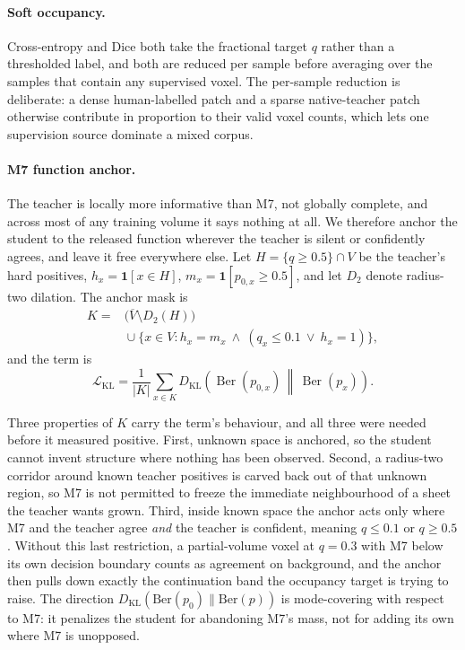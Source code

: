\paragraph{Soft occupancy.}
Cross-entropy and Dice both take the fractional target $q$ rather than a
thresholded label, and both are reduced per sample before averaging over the
samples that contain any supervised voxel.
The per-sample reduction is deliberate: a dense human-labelled patch and a
sparse native-teacher patch otherwise contribute in proportion to their valid
voxel counts, which lets one supervision source dominate a mixed corpus.

\paragraph{M7 function anchor.}
The teacher is locally more informative than M7, not globally complete, and
across most of any training volume it says nothing at all.
We therefore anchor the student to the released function wherever the teacher
is silent or confidently agrees, and leave it free everywhere else.
Let $H=\{q\geq0.5\}\cap V$ be the teacher's hard positives,
$h_x=\mathbf{1}[x\in H]$, $m_x=\mathbf{1}[p_{0,x}\geq0.5]$, and let $D_2$
denote radius-two dilation. The anchor mask is
\begin{align}
 K={}&\bigl(\overline{V}\setminus D_2(H)\bigr) \nonumber\\
 &{}\cup\{x\in V:h_x=m_x\ \wedge\ (q_x\leq0.1\ \vee\ h_x=1)\},
 \label{eq:kl-mask}
\end{align}
and the term is
\begin{equation}
 \mathcal{L}_{\mathrm{KL}}
 =\frac{1}{|K|}\sum_{x\in K}
 D_{\mathrm{KL}}\!\left(\operatorname{Ber}(p_{0,x})\,
 \middle\|\,\operatorname{Ber}(p_x)\right).
 \label{eq:m7-kl}
\end{equation}

Three properties of $K$ carry the term's behaviour, and all three were needed
before it measured positive.
First, unknown space is anchored, so the student cannot invent structure where
nothing has been observed.
Second, a radius-two corridor around known teacher positives is carved back out
of that unknown region, so M7 is not permitted to freeze the immediate
neighbourhood of a sheet the teacher wants grown.
Third, inside known space the anchor acts only where M7 and the teacher agree
\emph{and} the teacher is confident, meaning $q\leq0.1$ or $q\geq0.5$.
Without this last restriction, a partial-volume voxel at $q=0.3$ with M7 below
its own decision boundary counts as agreement on background, and the anchor
then pulls down exactly the continuation band the occupancy target is trying to
raise.
The direction $D_{\mathrm{KL}}(\mathrm{Ber}(p_0)\|\mathrm{Ber}(p))$ is
mode-covering with respect to M7: it penalizes the student for abandoning M7's
mass, not for adding its own where M7 is unopposed.


